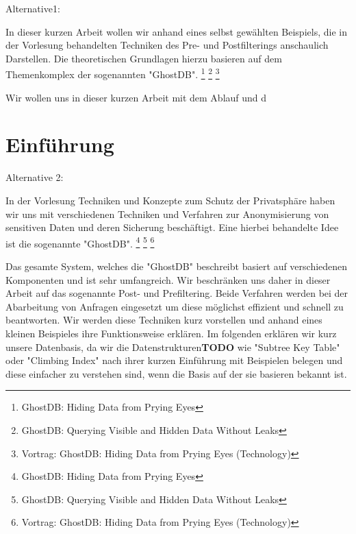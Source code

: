
Alternative1:

In dieser kurzen Arbeit wollen wir anhand eines selbst gewählten Beispiels, die in der Vorlesung behandelten Techniken des Pre- und Postfilterings anschaulich Darstellen. Die theoretischen Grundlagen hierzu basieren auf dem Themenkomplex der sogenannten "GhostDB". \footnote{GhostDB: Hiding Data from Prying Eyes }
\footnote{GhostDB: Querying Visible and Hidden Data Without Leaks}
\footnote{Vortrag: GhostDB: Hiding Data from Prying Eyes (Technology) }

Wir wollen uns in dieser kurzen Arbeit mit dem Ablauf und d 

\chapter{Einführung}
Alternative 2:

In der Vorlesung Techniken und Konzepte zum Schutz der Privatsphäre haben wir uns mit verschiedenen Techniken und Verfahren zur Anonymisierung von sensitiven Daten und deren Sicherung beschäftigt. Eine hierbei behandelte Idee ist die sogenannte "GhostDB". \footnote{GhostDB: Hiding Data from Prying Eyes }
\footnote{GhostDB: Querying Visible and Hidden Data Without Leaks}
\footnote{Vortrag: GhostDB: Hiding Data from Prying Eyes (Technology) }

Das gesamte System, welches die "GhostDB" beschreibt basiert auf verschiedenen Komponenten und ist sehr umfangreich. Wir beschränken uns daher in dieser Arbeit auf das sogenannte Post- und Prefiltering. Beide Verfahren werden bei der Abarbeitung von Anfragen eingesetzt um diese möglichst effizient und schnell zu beantworten. Wir werden diese Techniken kurz vorstellen und anhand eines kleinen Beispieles ihre Funktionsweise erklären.
Im folgenden erklären wir kurz unsere Datenbasis, da wir die Datenstrukturen\textbf{TODO} wie "Subtree Key Table" oder "Climbing Index" nach ihrer kurzen Einführung mit Beispielen belegen und diese einfacher zu verstehen sind, wenn die Basis auf der sie basieren bekannt ist.
	
	
